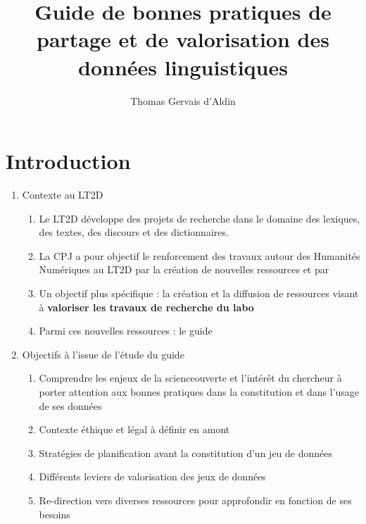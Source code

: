 \documentclass{book}
\title{Guide de bonnes pratiques de partage et de valorisation des données linguistiques}
\author{Thomas Gervais d'Aldin}
\begin{document}

%

\maketitle

\tableofcontents
\clearpage



\chapter*{Introduction}

\begin{enumerate}
	\item Contexte au LT2D
        \begin{enumerate}
            \item Le LT2D développe des projets de recherche dans le domaine des lexiques, des textes, des discours et des dictionnaires.
            \item La CPJ a pour objectif le renforcement des travaux autour des Humanités Numériques au LT2D par la création de nouvelles ressources et par 
            \item Un objectif plus spécifique : la création et la diffusion de ressources visant à \textbf{valoriser les travaux de recherche du labo}
            \item Parmi ces nouvelles ressources : le guide 
        \end{enumerate}
	\item Objectifs à l'issue de l'étude du guide
        \begin{enumerate}
            \item Comprendre les enjeux de la \gls{scienceouverte} et l'intérêt du chercheur à porter attention aux bonnes pratiques dans la constitution et dans l'usage de ses données
            \item Contexte éthique et légal à définir en amont
            \item Stratégies de planification avant la constitution d'un jeu de données
            \item Différents leviers de valorisation des jeux de données
            \item Re-direction vers diverses ressources pour approfondir en fonction de ses besoins
        \end{enumerate}
\end{enumerate}
\end{document}
